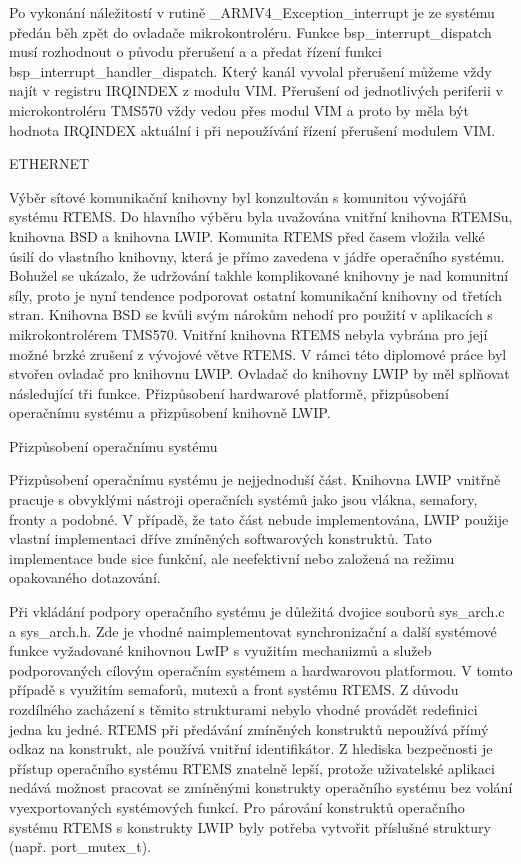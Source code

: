 Po vykonání náležitostí v rutině \_ARMV4\_Exception\_interrupt je ze systému předán běh zpět do ovladače mikrokontroléru.
Funkce bsp\_interrupt\_dispatch musí rozhodnout o původu přerušení a a předat řízení funkci bsp\_interrupt\_handler\_dispatch.
Který kanál vyvolal přerušení můžeme vždy najít v registru IRQINDEX z modulu VIM.
Přerušení od jednotlivých periferii v microkontroléru TMS570 vždy vedou přes modul VIM a proto by měla být hodnota IRQINDEX aktuální i při nepoužívání řízení přerušení modulem VIM.

\sec ETHERNET

	Výběr sítové komunikační knihovny byl konzultován s komunitou vývojářů systému RTEMS.
Do hlavního výběru byla uvažována vnitřní knihovna RTEMSu, knihovna BSD a knihovna LWIP.
Komunita RTEMS před časem vložila velké úsilí do vlastního knihovny, která je přímo zavedena v jádře operačního systému.
Bohužel se ukázalo, že udržování takhle komplikované knihovny je nad komunitní síly, proto je nyní tendence podporovat ostatní komunikační knihovny od třetích stran.
Knihovna BSD se kvůli svým nárokům nehodí pro použití v aplikacích s mikrokontrolérem TMS570.
Vnitřní knihovna RTEMS nebyla vybrána pro její možné brzké zrušení z vývojové větve RTEMS.
V rámci této diplomové práce byl stvořen ovladač pro knihovnu LWIP.
Ovladač do knihovny LWIP by měl splňovat následující tři funkce.
Přizpůsobení hardwarové platformě, přizpůsobení operačnímu systému a přizpůsobení knihovně LWIP. 

\secc Přizpůsobení operačnímu systému

Přizpůsobení operačnímu systému je nejjednoduší část.
Knihovna LWIP vnitřně pracuje s obvyklými nástroji operačních systémů jako jsou vlákna, semafory, fronty a podobné.
V případě, že tato část nebude implementována, LWIP použije vlastní implementaci dříve zmíněných softwarových konstruktů.
Tato implementace bude sice funkční, ale neefektivní nebo založená na režimu opakovaného dotazování.

Při vkládání podpory operačního systému je důležitá dvojice souborů sys\_arch.c a sys\_arch.h.{}
Zde je vhodné naimplementovat synchronizační a další systémové funkce vyžadované knihovnou LwIP s využitím mechanizmů a služeb podporovaných cílovým operačním systémem a hardwarovou platformou.
V tomto případě s využitím semaforů, mutexů a front systému RTEMS.
Z důvodu rozdílného zacházení s těmito strukturami nebylo vhodné provádět redefinici jedna ku jedné.
RTEMS při předávání zmíněných konstruktů nepoužívá přímý odkaz na konstrukt, ale používá vnitřní identifikátor.
Z hlediska bezpečnosti je přístup operačního systému RTEMS znatelně lepší, protože uživatelské aplikaci nedává možnost pracovat se zmíněnými konstrukty operačního systému bez volání vyexportovaných systémových funkcí.
Pro párování konstruktů operačního systému RTEMS s konstrukty LWIP byly potřeba vytvořit příslušné struktury (např. port\_mutex\_t).

